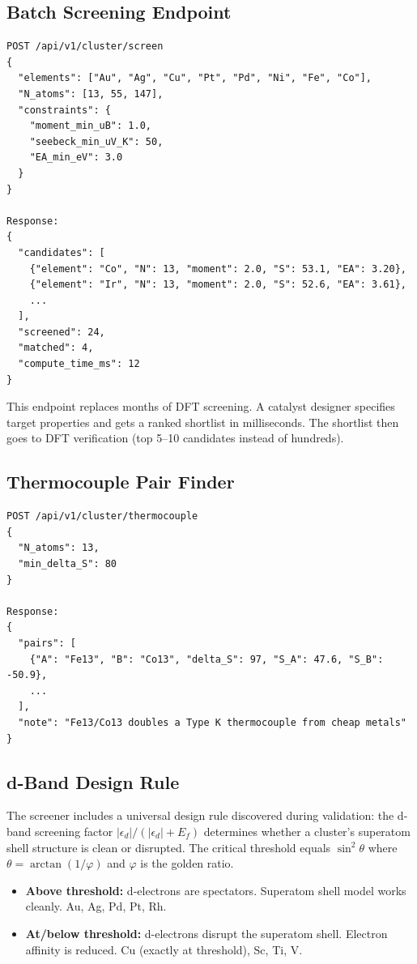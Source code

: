 \documentclass[11pt,letterpaper]{article}
\begin{document}
\subsection{Batch Screening Endpoint}

\begin{verbatim}
POST /api/v1/cluster/screen
{
  "elements": ["Au", "Ag", "Cu", "Pt", "Pd", "Ni", "Fe", "Co"],
  "N_atoms": [13, 55, 147],
  "constraints": {
    "moment_min_uB": 1.0,
    "seebeck_min_uV_K": 50,
    "EA_min_eV": 3.0
  }
}

Response:
{
  "candidates": [
    {"element": "Co", "N": 13, "moment": 2.0, "S": 53.1, "EA": 3.20},
    {"element": "Ir", "N": 13, "moment": 2.0, "S": 52.6, "EA": 3.61},
    ...
  ],
  "screened": 24,
  "matched": 4,
  "compute_time_ms": 12
}
\end{verbatim}

This endpoint replaces months of DFT screening. A catalyst designer
specifies target properties and gets a ranked shortlist in milliseconds.
The shortlist then goes to DFT verification (top 5--10 candidates
instead of hundreds).

\subsection{Thermocouple Pair Finder}

\begin{verbatim}
POST /api/v1/cluster/thermocouple
{
  "N_atoms": 13,
  "min_delta_S": 80
}

Response:
{
  "pairs": [
    {"A": "Fe13", "B": "Co13", "delta_S": 97, "S_A": 47.6, "S_B": -50.9},
    ...
  ],
  "note": "Fe13/Co13 doubles a Type K thermocouple from cheap metals"
}
\end{verbatim}

\subsection{d-Band Design Rule}

The screener includes a universal design rule discovered during
validation: the d-band screening factor
$|{\epsilon_d}|/(|{\epsilon_d}| + E_f)$ determines whether a
cluster's superatom shell structure is clean or disrupted.
The critical threshold equals $\sin^2\theta$ where
$\theta = \arctan(1/\varphi)$ and $\varphi$ is the golden ratio.

\begin{itemize}
  \item \textbf{Above threshold:} d-electrons are spectators.
    Superatom shell model works cleanly. Au, Ag, Pd, Pt, Rh.
  \item \textbf{At/below threshold:} d-electrons disrupt the
    superatom shell. Electron affinity is reduced. Cu (exactly at
    threshold), Sc, Ti, V.
\end{itemize}
\end{document}

